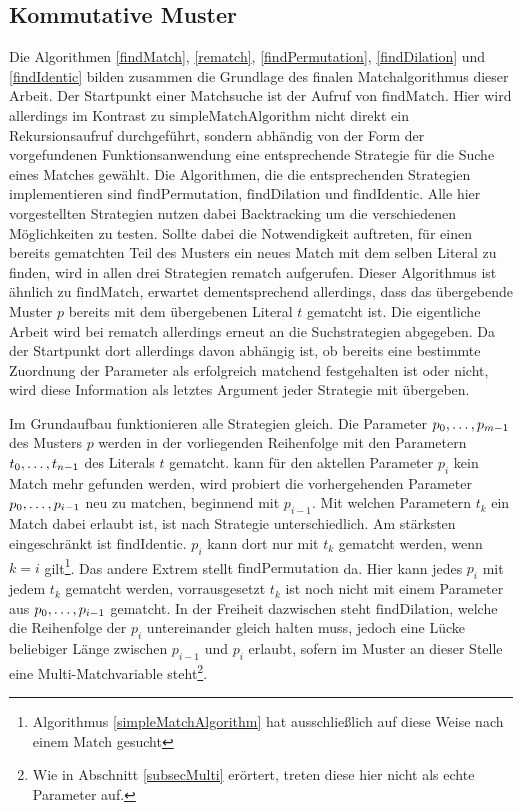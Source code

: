 \subsection{Kommutative Muster} \label{subsecACMuster}

Die Algorithmen \ref{findMatch}, \ref{rematch}, \ref{findPermutation}, \ref{findDilation} und \ref{findIdentic} bilden zusammen die Grundlage des finalen Matchalgorithmus dieser Arbeit. Der Startpunkt einer Matchsuche ist der Aufruf von $\mathrm{findMatch}$. Hier wird allerdings im Kontrast zu $\mathrm{simpleMatchAlgorithm}$ nicht direkt ein Rekursionsaufruf durchgeführt, sondern abhändig von der Form der vorgefundenen Funktionsanwendung eine entsprechende Strategie für die Suche eines Matches gewählt. Die Algorithmen, die die entsprechenden Strategien implementieren sind $\mathrm{findPermutation}$, $\mathrm{findDilation}$ und $\mathrm{findIdentic}$. Alle hier vorgestellten Strategien nutzen dabei Backtracking um die verschiedenen Möglichkeiten zu testen. Sollte dabei die Notwendigkeit auftreten, für einen bereits gematchten Teil des Musters ein neues Match mit dem selben Literal zu finden, wird in allen drei Strategien $\mathrm{rematch}$ aufgerufen. Dieser Algorithmus ist ähnlich zu $\mathrm{findMatch}$, erwartet dementsprechend allerdings, dass das übergebende Muster $p$ bereits mit dem übergebenen Literal $t$ gematcht ist. Die eigentliche Arbeit wird bei $\mathrm{rematch}$ allerdings erneut an die Suchstrategien abgegeben. Da der Startpunkt dort allerdings davon abhängig ist, ob bereits eine bestimmte Zuordnung der Parameter als erfolgreich matchend festgehalten ist oder nicht, wird diese Information als letztes Argument jeder Strategie mit übergeben.


Im Grundaufbau funktionieren alle Strategien gleich. Die Parameter ${p}_{0}, \dots, {p}_{m-1}$ des Musters $p$ werden in der vorliegenden Reihenfolge mit den Parametern ${t}_{0}, \dots, {t}_{n-1}$ des Literals $t$ gematcht. kann für den aktellen Parameter $p_i$ kein Match mehr gefunden werden, wird probiert die vorhergehenden Parameter ${p}_{0}, \dots, {p}_{i-1}$ neu zu matchen, beginnend mit $p_{i-1}$. Mit welchen Parametern $t_k$ ein Match dabei erlaubt ist, ist nach Strategie unterschiedlich. Am stärksten eingeschränkt ist $\mathrm{findIdentic}$. $p_i$ kann dort nur mit $t_k$ gematcht werden, wenn $k = i$ gilt\footnote{Algorithmus \ref{simpleMatchAlgorithm} hat ausschließlich auf diese Weise nach einem Match gesucht}. Das andere Extrem stellt $\mathrm{findPermutation}$ da. Hier kann jedes $p_i$ mit jedem $t_k$ gematcht werden, vorrausgesetzt $t_k$ ist noch nicht mit einem Parameter aus ${p}_{0}, \dots, {p}_{i-1}$ gematcht. In der Freiheit dazwischen steht $\mathrm{findDilation}$, welche die Reihenfolge der $p_i$ untereinander gleich halten muss, jedoch eine Lücke beliebiger Länge zwischen $p_{i-1}$ und $p_i$ erlaubt, sofern im Muster an dieser Stelle eine Multi-Matchvariable steht\footnote{Wie in Abschnitt \ref{subsecMulti} erörtert, treten diese hier nicht als echte Parameter auf.}.


